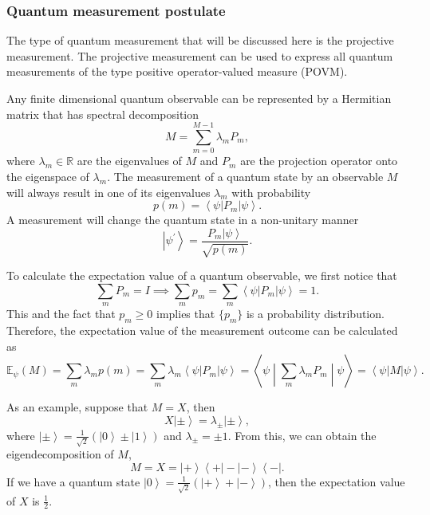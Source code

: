 \documentclass[11pt]{article}
\newcommand{\braketmatrix}[3]{\left \langle #1 \middle| #2 \middle| #3 \right \rangle}
\newcommand{\bra}[1]{\left\langle #1\right|}
\newcommand{\ket}[1]{\left|#1\right\rangle}
\begin{document}
\subsubsection{Quantum measurement postulate}
The type of quantum measurement that will be discussed here is the projective measurement. The projective measurement can be used to express all quantum measurements of the type positive operator-valued measure (POVM).

Any finite dimensional quantum observable can be represented by a Hermitian matrix that has spectral decomposition
\begin{equation}
    M = \sum_{m=0}^{M-1}\lambda_mP_m,
\end{equation}
where $\lambda_m \in \mathbb{R}$ are the eigenvalues of $M$ and $P_m$ are the projection operator onto the eigenspace of $\lambda_m$.  
The measurement of a quantum state by an observable $M$ will always result in one of its eigenvalues $\lambda_m$ with probability 
\begin{equation}
    p(m) = \bra{\psi}P_m\ket{\psi}.
\end{equation}
A measurement will change the quantum state in a non-unitary manner 
\begin{equation}
    \ket{\psi^{'}} = \frac{P_m\ket{\psi}}{\sqrt{p(m)}}.
\end{equation}

To calculate the expectation value of a quantum observable, we first notice that 
\begin{equation}
    \sum_mP_m = I \implies \sum_mp_m = \sum_m\bra{\psi}P_m\ket{\psi} = 1.
\end{equation}
This and the fact that $p_m \geq 0$ implies that $\{p_m\}$ is a probability distribution. 
Therefore, the expectation value of the measurement outcome can be calculated as 
\begin{equation}
    \mathbb{E}_\psi(M) = \sum_m\lambda_mp(m) = \sum_m\lambda_m\bra{\psi}P_m\ket{\psi} = \braketmatrix{\psi}{\sum_m\lambda_mP_m}{\psi}=\bra{\psi}M\ket{\psi}.
\end{equation}

As an example, suppose that $M = X$, then
\begin{equation}
    X\ket{\pm} = \lambda_{\pm}\ket{\pm},
\end{equation}
where $\ket{\pm} = \frac{1}{\sqrt{2}}(\ket{0} \pm \ket{1})$ and $\lambda_{\pm} = \pm 1$. From this, we can obtain the eigendecomposition of $M$,
\begin{equation}
    M = X = \ket{+}\bra{+} - \ket{-}\bra{-}.
\end{equation}
If we have a quantum state $\ket{0} = \frac{1}{\sqrt{2}}(\ket{+} + \ket{-})$, then the expectation value of $X$ is $\frac{1}{2}$.





\end{document}
